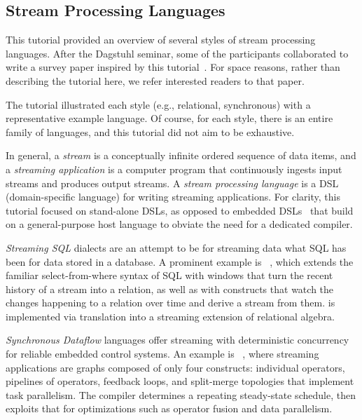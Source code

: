 \subsection{Stream Processing Languages}\label{sec:tut_lang}

This tutorial provided an overview of several styles of stream
processing languages. After the Dagstuhl seminar, some of the
participants collaborated to write a survey paper inspired by this
tutorial~\cite{hirzel_et_al_2018}. For space reasons, rather than
describing the tutorial here, we refer interested readers to that
paper.

\iffalse
The tutorial illustrated each style (e.g., relational,
synchronous) with a representative example language. Of course,
for each style, there is an entire family of languages, and this
tutorial did not aim to be exhaustive.

In general, a \emph{stream} is a conceptually infinite ordered
sequence of data items, and a \emph{streaming application} is a
computer program that continuously ingests input streams and produces
output streams.  A \emph{stream processing language} is a DSL
(domain-specific language) for writing streaming applications.  For
clarity, this tutorial focused on stand-alone DSLs, as opposed to
embedded DSLs~\cite{hudak_1998} that build on a general-purpose host
language to obviate the need for a dedicated compiler.

\emph{Streaming SQL} dialects are an attempt to be for streaming data
what SQL has been for data stored in a database. A prominent example
is ~\cite{arasu_babu_widom_2006}, which extends the familiar
select-from-where syntax of SQL with windows that turn the recent
history of a stream into a relation, as well as with constructs that
watch the changes happening to a relation over time and derive a
stream from them.  is implemented via translation into a streaming
extension of relational algebra.

\emph{Synchronous Dataflow} languages offer streaming with
deterministic concurrency for reliable embedded control systems. An
example is ~\cite{thies_et_al_2002}, where streaming
applications are graphs composed of only four constructs: individual
operators, pipe\-lines of operators, feedback loops, and split-merge
topologies that implement task parallelism. The  compiler
determines a repeating steady-state schedule, then exploits that for
optimizations such as operator fusion and data parallelism.

